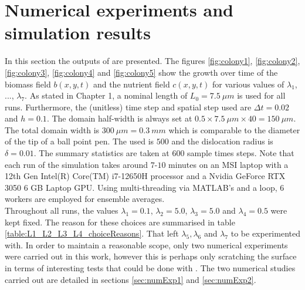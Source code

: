 \chapter{Numerical experiments and simulation results}
In this section the outputs of 
are presented. The figures \ref{fig:colony1}, \ref{fig:colony2},
\ref{fig:colony3}, \ref{fig:colony4} and \ref{fig:colony5} show the 
growth over time of the biomass field $b(x,y,t)$ and the nutrient 
field $c(x,y,t)$ for various values of $\lambda_1$, ..., $\lambda_7$.
As stated in Chapter 1, a nominal length of $L_0 = 7.5 \ \mu m$ is 
used for all runs. Furthermore, the (unitless) time step and spatial step used are 
$\Delta t = 0.02$ and $h = 0.1$. The domain half-width is always set 
at $0.5 \times 7.5 \ \mu m \times 40 = 150 \ \mu m$. The total domain 
width is $300 \ \mu m = 0.3 \ mm$ which is comparable to the diameter 
of the tip of a ball point pen. The  used 
is $500$ and the dislocation radius is $\delta = 0.01$. The summary statistics 
are taken at $600$ sample times steps. Note that each run 
of the simulation takes around $7$-$10$ minutes on an MSI laptop 
with a 12th Gen Intel(R) Core(TM) i7-12650H processor
and a Nvidia GeForce RTX 3050 6 GB Laptop GPU. Using 
multi-threading via MATLAB's  and a
 loop, $6$ workers are employed for ensemble 
averages.
\\

Throughout all runs, the values $\lambda_1 = 0.1$, $\lambda_2 = 5.0$, $\lambda_3 = 5.0$ and 
$\lambda_4 = 0.5$ were kept fixed. The reason for these choices are 
summarised in table \ref{table:L1_L2_L3_L4_choiceReasons}. That left $\lambda_5, \lambda_6$ and $\lambda_7$
to be experimented with. In order to maintain a reasonable 
scope, only two numerical experiments were carried out in this work, however this is perhaps only 
scratching the surface in terms of interesting tests that could be done with .
The two numerical studies carried out are detailed in sections \ref{sec:numExp1} and \ref{sec:numExp2}.

